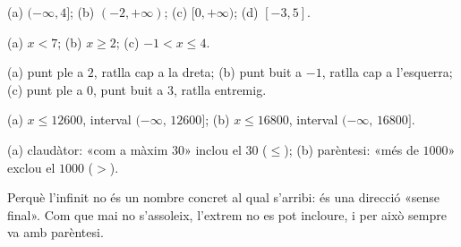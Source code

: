 \begin{solucions}
\begin{sollist}
  \item (a) $(-\infty,4]$; \quad (b) $(-2,+\infty)$; \quad (c) $[0,+\infty)$; \quad
        (d) $[-3,5]$.
  \item (a) $x<7$; \quad (b) $x\ge 2$; \quad (c) $-1<x\le 4$.
  \item (a) punt ple a $2$, ratlla cap a la dreta; \quad (b) punt buit a $-1$, ratlla
        cap a l'esquerra; \quad (c) punt ple a $0$, punt buit a $3$, ratlla entremig.
  \item (a) $x\le\num{12600}$, interval $(-\infty,\,\num{12600}]$; \quad
        (b) $x\le\num{16800}$, interval $(-\infty,\,\num{16800}]$.
  \item (a) claudàtor: «com a màxim $30$» inclou el $30$ ($\le$); \quad
        (b) parèntesi: «més de $1000$» exclou el $1000$ ($>$).
  \item Perquè l'infinit no és un nombre concret al qual s'arribi: és una direcció
        «sense final». Com que mai no s'assoleix, l'extrem no es pot incloure, i per
        això sempre va amb parèntesi.
\end{sollist}
\end{solucions}
